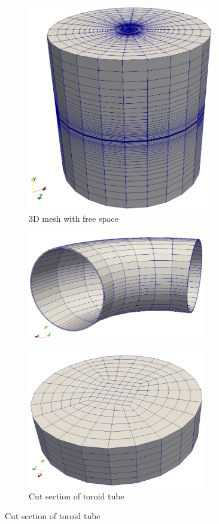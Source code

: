 \documentclass[11pt,a4paper,final]{article}
\begin{document}
\begin{figure}[htb]
\centering
\begin{subfigure}[b]{0.39\textwidth}
\centering
\includegraphics[width=0.9\textwidth]{3d_mesh_1.png}
\caption{3D mesh with free space}
\label{fig:1.3.1}
\end{subfigure}
\begin{subfigure}[b]{0.29\textwidth}
\centering
\includegraphics[width=0.85\textwidth]{3d_mesh_3.png}
\label{fig:1.3.2}
\caption{Cut section of toroid tube}
\includegraphics[width=0.85\textwidth]{3d_mesh_5.png}

\end{subfigure}
\end{figure}
\end{document}
